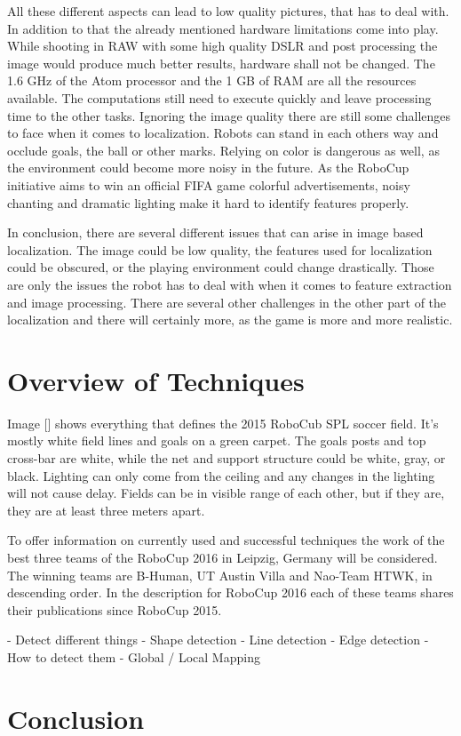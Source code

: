 \documentclass[12pt, a4paper]{scrartcl}
\begin{document}
  All these different aspects can lead to low quality pictures, that has to deal with. In addition to that the already mentioned hardware limitations come into play. While shooting in RAW with some high quality DSLR and post processing the image would produce much better results, hardware shall not be changed. The 1.6 GHz of the Atom processor and the 1 GB of RAM are all the resources available. The computations still need to execute quickly and leave processing time to the other tasks. Ignoring the image quality there are still some challenges to face when it comes to localization. Robots can stand in each others way and occlude goals, the ball or other marks. Relying on color is dangerous as well, as the environment could become more noisy in the future. As the RoboCup initiative aims to win an official FIFA game colorful advertisements, noisy chanting and dramatic lighting make it hard to identify features properly.

  In conclusion, there are several different issues that can arise in image based localization. The image could be low quality, the features used for localization could be obscured, or the playing environment could change drastically. Those are only the issues the robot has to deal with when it comes to feature extraction and image processing. There are several other challenges in the other part of the localization and there will certainly more, as the game is more and more realistic.

  \section{Overview of Techniques}
  Image [] shows everything that defines the 2015 RoboCub SPL soccer field. It's mostly white field lines and goals on a green carpet. The goals posts and top cross-bar are white, while the net and support structure could be white, gray, or black. Lighting can only come from the ceiling and any changes in the lighting will not cause delay. Fields can be in visible range of each other, but if they are, they are at least three meters apart.

  To offer information on currently used and successful techniques the work of the best three teams of the RoboCup 2016 in Leipzig, Germany will be considered. The winning teams are B-Human, UT Austin Villa and Nao-Team HTWK, in descending order. In the description for RoboCup 2016 each of these teams shares their publications since RoboCup 2015.

  - Detect different things
  - Shape detection
  - Line detection
  - Edge detection
  - How to detect them
  - Global / Local Mapping

  \section{Conclusion}
\end{document}
